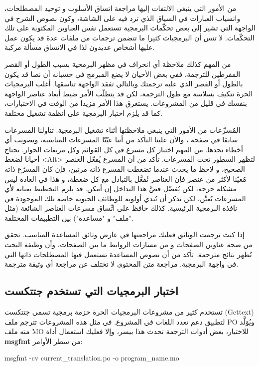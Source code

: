 من الأمور التي ينبغي الالتفات إليها مراجعة اتساق الأسلوب و توحيد
المصطلحات، وانسياب العبارات في السياق الذي ترد فيه على الشاشة، وكون
نصوص الشرح في الواجهة التي تشير إلى بعض تحكّمات البرمجية تستعمل نفس
العناوين المكتوبة على تلك التحكّمات. لا تنس أن البرمجيات كثيرا ما تتضمن
ترجمات من ملفات عدة قد يكون عمل عليها أشخاص عديدون لذا في الاتساق مسألة
مركبة.

من المهم كذلك ملاحظة أي انحراف في مظهر البرمجية بسبب الطول أو القصر
المفرطين للترجمة، ففي بعض الأحيان لا يضع المبرمج في حسبانه أن نصا قد
يكون بالطول أو القصر الذي عليه ترجمتك وبالتالي تفقد الواجهة تناسقها.
أغلب البرمجيات الحرة تتكيف بسلاسة مع طول الترجمة، لكن قد يتطلّب الأمر
ضبط أبعاد عناصر الواجهة بنفسك في قليل من المشروعات. يستغرق هذا الأمر
مزيدا من الوقت في الاختبارات، كما قد يلزم اختبار البرمجية على أنظمة
تشغيل مختلفة.

المُسرِّعات من الأمور التي ينبغي ملاحظتها أثناء تشغيل البرمجية. تناولنا
المسرعات سابقا في صفحة \at[ref:34484726]، والآن علينا التأكد
من أننا عيّنّا المسرعات المناسبة، وتصويب أي أخطاء نجدها. من المهم
اختبار كل مسرع في كل القوائم وكل مربعات الحوار. تحتاج أحيانا لضغط <Alt>
لتظهر السطور تحت المسرعات. تأكد من أن المسرع يُفعّل العنصر الصحيح، و
لاحظ ما يحدث عندما تضغطت المسرع ذاته مرتين، فإن كان المسرّع ذاته
مُعيّنا لأكثر من عنصر فإن العناصر تُفعَّل بالتبادل مع كل ضغطة، و هذا في
العادة ليس مشكلة حرجة، لكن يُفضّل فضَّ هذا التداخل إن أمكن. قد يلزم
التخطيط بعناية لأي المسرعات تُعيِّن، لكن تذكر أن تُبدي أولوية للوظائف
الحيوية خاصة تلك الموجودة في نافذة البرمجية الرئيسية. كذلك حافظ على
اتِّساق مسرعات العناصر الشائعة (مثل "ملف" و "مساعدة") بين التطبيقات
المختلفة.

إذا كنت ترجمت الوثائق فعليك مراجعتها في عارض وثائق المساعدة المناسب.
تحقق من صحة عناوين الصفحات و من مسارات الروابط ما بين الصفحات، وأن
وظيفة البحث تُظهر نتائج مترجمة. تأكد من أن نصوص المساعدة تستعمل فيها
المصطلحات ذاتها التي في واجهة البرمجية. مراجعة متن المحتوى لا تختلف عن
مراجعة أي وثيقة مترجمة.

\subsection{اختبار البرمجيات التي تستخدم جتتكست}
تستخدم كثير من مشروعات البرمجيات الحرة حزمة برمجية تسمى جتتكست (Gettext)
لتطبيق دعم تعدد اللغات في المشروع. في مثل هذه المشروعات تترجم ملف PO
ويُوَلَّد منه ملف MO للاختبار، بعض أدوات الترجمة تحدث هذا بيسر، وإلا
فعليك استعمال أداة {\bf msgfmt} من سطر الأوامر:

msgfmt  -cv  current\_translation.po  -o program\_name.mo

